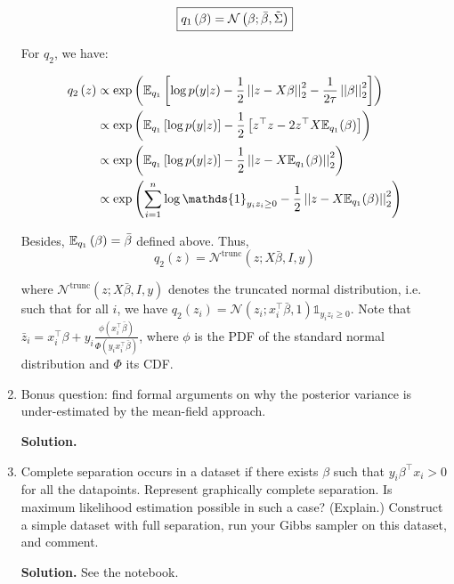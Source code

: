 \documentclass[a4paper, 11pt]{article}
\begin{document}
\begin{enumerate}
    \begin{equation*}
        \boxed{q_1 \left( \beta \right) = \mathcal{N} \left( \beta; \bar{\beta}, \Tilde{\Sigma} \right)}
    \end{equation*}
    
    For $q_2$, we have:
    
    \begin{equation*}
        \begin{aligned}
        q_2 \left( z \right) &\propto \exp \left( \E_{q_1} \left[ \log p ( y | z ) - \frac{1}{2} \norm{z - X \beta}{2}^{2} - \frac{1}{2 \tau} \norm{\beta}{2}^{2} \right] \right) \\
        &\propto \exp \left( \E_{q_1} \left[ \log p(y|z) \right] - \frac{1}{2} \left[ z^\top z - 2 z^\top X \E_{q_1}(\beta) \right] \right) \\
        &\propto \exp \left( \E_{q_1} \left[ \log p(y|z) \right] - \frac{1}{2} \norm{z - X \E_{q_1}(\beta)}{2}^{2} \right) \\
        &\propto \exp \left( \sum_{i=1}^n \log \mathds{1}_{y_i z_i \geq 0} - \frac{1}{2} \norm{z - X \E_{q_1}(\beta)}{2}^{2} \right)
        \end{aligned}
    \end{equation*}
    
    Besides, $\mathbb{E}_{q_1} \left( \beta \right) = \bar{\beta}$ defined above. Thus,
    \begin{equation*}
        \boxed{q_2 \left( z \right) = \mathcal{N}^{\text{trunc}} \left( z; X \bar{\beta}, I, y \right)}
    \end{equation*}
    
    where $\mathcal{N}^{\text{trunc}} \left( z; X \bar{\beta}, I, y \right)$ denotes the truncated normal distribution, i.e. such that for all $i$, we have $q_2(z_i) = \mathcal{N} \left( z_i; x_i^\top \bar{\beta}, 1 \right) \mathds{1}_{y_i z_i \geq 0}$. Note that $\bar{z}_i = x_i^\top \beta + y_i \frac{\phi \left( x_i^\top \bar{\beta} \right)}{\Phi \left( y_i x_i^\top \bar{\beta} \right)}$, where $\phi$ is the PDF of the standard normal distribution and $\Phi$ its CDF.
    
    
    
    \item Bonus question: find formal arguments on why the posterior variance is under-estimated by the mean-field approach.
    
    \textbf{Solution.}
    
    
    
    \item Complete separation occurs in a dataset if there exists $\beta$ such that $y_i \beta^\top x_i > 0$ for all the datapoints. Represent graphically complete separation. Is maximum likelihood estimation possible in such a case? (Explain.) Construct a simple dataset with full separation, run your Gibbs sampler on this dataset, and comment.
    
    \textbf{Solution.} See the notebook.


\end{enumerate}
\end{document}
